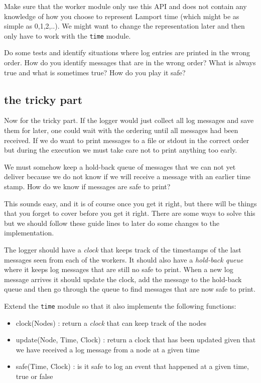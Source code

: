 \documentclass[a4paper, 11pt]{article}
\begin{document}
Make sure that the worker module only use this API and does not
contain any knowledge of how you choose to represent Lamport time
(which might be as simple as 0,1,2,..). We might want to change the
representation later and then only have to work with the {\tt time} module.

Do some tests and identify situations where log entries are printed in
the wrong order. How do you identify messages that are in the wrong order?
What is always true and what is sometimes true? How do you play it safe?


\subsection{the tricky part}

Now for the tricky part. If the logger would just collect all log
messages and save them for later, one could wait with the ordering
until all messages had been received. If we do want to print messages
to a file or stdout in the correct order but during the execution we
must take care not to print anything too early.

We must somehow keep a hold-back queue of messages that we can not yet
deliver because we do not know if we will receive a message with an
earlier time stamp. How do we know if messages are safe to print?

This sounds easy, and it is of course once you get it right, but there
will be things that you forget to cover before you get it right. There
are some ways to solve this but we should follow these guide lines to
later do some changes to the implementation.

The logger should have a {\em clock} that keeps track of the
timestamps of the last messages seen from each of the workers. It
should also have a {\em hold-back queue} where it keeps log messages
that are still no safe to print. When a new log message arrives it
should update the clock, add the message to the hold-back queue and
then go through the queue to find messages that are now safe to print.

Extend the {\tt time} module so that it also implements the following
functions:

\begin{itemize}
\item clock(Nodes) : return a {\em clock} that can keep track of the nodes
\item update(Node, Time, Clock) : return a clock that has been updated given that we have received a log message from a node at a given time
\item safe(Time, Clock) : is it safe to log an event that happened at a given time, true or false
\end{itemize}
\end{document}
